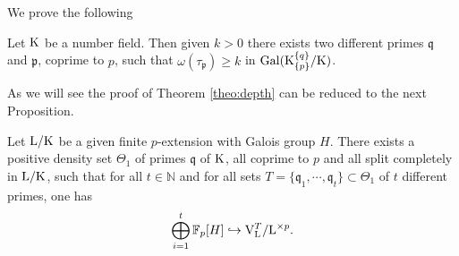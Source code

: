 \documentclass[12pt,a4paper,twoside,english]{smfart}
\def\fq{{\mathbb F}}
\def\p{{\mathfrak p}}
\def\q{{\mathfrak q}}
\def\K{{\rm K}}
\def\L{{\rm L}}
\def\V{{\rm V}}
\def\Gal{{\rm Gal}}
\begin{document}
We  prove the following


\begin{theo} \label{theo:depth} Let $\K$ be a number field. 
 Then given $k>0$ there exists two different primes   $\q$ and $\p$, coprime to $p$,  such that 
$\omega(\tau_\p)\geq k$ in $\Gal(\K_{\{\p\}}^{\{\q\}}/\K)$. \end{theo}  


As we will see the proof of Theorem \ref{theo:depth} can be reduced to the next Proposition.



\begin{prop} \label{theo:free-part}
Let $\L/\K$ be a given finite $p$-extension with Galois group $H$. 
There exists a positive density set $\Theta_1$ of primes $\q$ of $\K$, all coprime to  $p$ and all split  completely  in $\L/\K$, such that for all 
 $t\in \mathbb N$ 
and for all sets $T=\{\q_1,\cdots, \q_t \} \subset \Theta_1$ of $t$ different primes, one has  $$ \bigoplus_{i=1}^t \fq_p[H] \hookrightarrow \V_\L^T/\L^{\times p}.$$
\end{prop}
\end{document}
